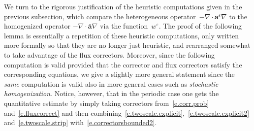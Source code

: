 \documentclass[11pt]{article} %
\numberwithin{equation}{section}
\theoremstyle{definition}
\newcommand{\eps}{\varepsilon}
\newcommand{\ep}{\eps}
\renewcommand{\a}{\mathbf{a}}
\newcommand{\ahom}{\bar{\a}}
\begin{document}
We turn to the rigorous justification of the heuristic computations given in the previous subsection, which compare the heterogeneous operator~$-\nabla \cdot \a^\ep\nabla$ to the homogenized operator $-\nabla\cdot \ahom\nabla$ via the function~$w^\ep$. The proof of the following lemma is essentially a repetition of these heuristic computations, only written more formally so that they are no longer just heuristic, and rearranged somewhat to take advantage of the flux correctors. Moreover, since the following computation is valid provided that the corrector and flux correctors satisfy the corresponding equations, we give a slightly more general statement since the \emph{same} computation is valid also in more general cases such as \emph{stochastic homogenization}.  Notice, however, that in the periodic case one gets the quantitative estimate by simply taking correctors from~\eqref{e.corr.prob} and~\eqref{e.fluxcorrect} and then combining~\eqref{e.twoscale.explicit},~\eqref{e.twoscale.explicit2} and~\eqref{e.twoscale.strip} with~\eqref{e.correctorsbounded2}. 
\end{document}
